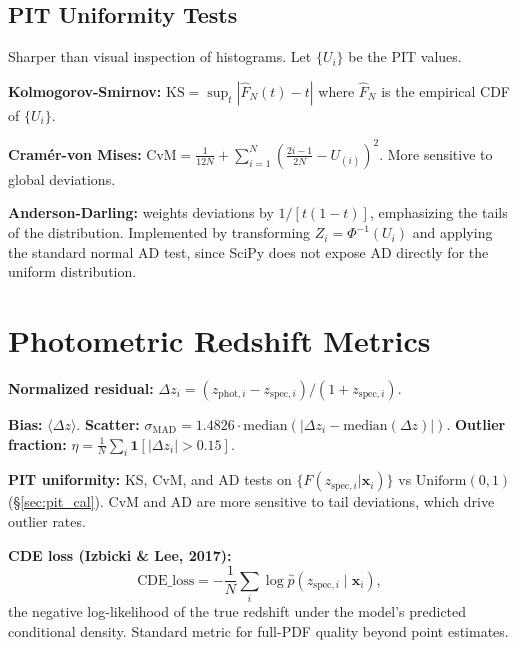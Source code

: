 \documentclass[11pt,a4paper]{article}
\theoremstyle{definition}
\newcommand{\bx}{\mathbf{x}}
\begin{document}
\subsection{PIT Uniformity Tests}

Sharper than visual inspection of histograms. Let $\{U_i\}$ be the PIT
values.

\textbf{Kolmogorov-Smirnov:} $\text{KS} = \sup_t |\hat{F}_N(t) - t|$
where $\hat{F}_N$ is the empirical CDF of $\{U_i\}$.

\textbf{Cramér-von Mises:}
$\text{CvM} = \tfrac{1}{12N} + \sum_{i=1}^{N}\!\left(\tfrac{2i-1}{2N} - U_{(i)}\right)^2$.
More sensitive to global deviations.

\textbf{Anderson-Darling:} weights deviations by $1/[t(1-t)]$, emphasizing
the tails of the distribution. Implemented by transforming
$Z_i = \Phi^{-1}(U_i)$ and applying the standard normal AD test, since
SciPy does not expose AD directly for the uniform distribution.

\section{Photometric Redshift Metrics}
\label{sec:pz_metrics}

\textbf{Normalized residual:}
$\Delta z_i = (z_{\mathrm{phot},i} - z_{\mathrm{spec},i}) / (1 + z_{\mathrm{spec},i})$.

\textbf{Bias:} $\langle \Delta z \rangle$.
\textbf{Scatter:} $\sigma_{\mathrm{MAD}} = 1.4826 \cdot \mathrm{median}(|\Delta z_i - \mathrm{median}(\Delta z)|)$.
\textbf{Outlier fraction:} $\eta = \frac{1}{N}\sum_i \mathbf{1}[|\Delta z_i| > 0.15]$.

\textbf{PIT uniformity:} KS, CvM, and AD tests on
$\{F(z_{\mathrm{spec},i}|\bx_i)\}$ vs $\mathrm{Uniform}(0,1)$
(§\ref{sec:pit_cal}). CvM and AD are more sensitive to tail deviations,
which drive outlier rates.

\textbf{CDE loss (Izbicki \& Lee, 2017):}
\begin{equation}
  \mathrm{CDE\_loss} = -\frac{1}{N}\sum_i \log \hat{p}(z_{\mathrm{spec},i} \mid \bx_i),
  \label{eq:cde}
\end{equation}
the negative log-likelihood of the true redshift under the model's
predicted conditional density. Standard metric for full-PDF quality
beyond point estimates.
\end{document}
